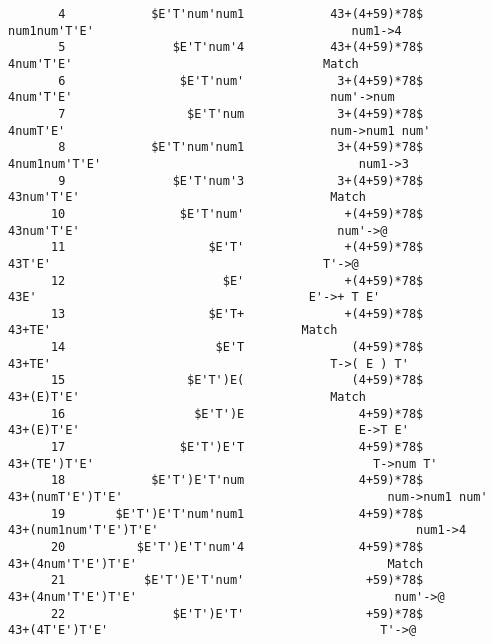 \documentclass[UTF8]{ctexart}
\begin{document}
\begin{lstlisting}
       4            $E'T'num'num1            43+(4+59)*78$                              num1num'T'E'                                    num1->4
       5               $E'T'num'4            43+(4+59)*78$                              4num'T'E'                                   Match
       6                $E'T'num'             3+(4+59)*78$                             4num'T'E'                                    num'->num
       7                 $E'T'num             3+(4+59)*78$                             4numT'E'                                     num->num1 num'
       8            $E'T'num'num1             3+(4+59)*78$                             4num1num'T'E'                                    num1->3
       9               $E'T'num'3             3+(4+59)*78$                             43num'T'E'                                   Match
      10                $E'T'num'              +(4+59)*78$                            43num'T'E'                                    num'->@
      11                    $E'T'              +(4+59)*78$                            43T'E'                                      T'->@
      12                      $E'              +(4+59)*78$                            43E'                                      E'->+ T E'
      13                    $E'T+              +(4+59)*78$                            43+TE'                                   Match
      14                     $E'T               (4+59)*78$                           43+TE'                                       T->( E ) T'
      15                 $E'T')E(               (4+59)*78$                           43+(E)T'E'                                   Match
      16                  $E'T')E                4+59)*78$                          43+(E)T'E'                                       E->T E'
      17                $E'T')E'T                4+59)*78$                          43+(TE')T'E'                                       T->num T'
      18            $E'T')E'T'num                4+59)*78$                          43+(numT'E')T'E'                                     num->num1 num'
      19       $E'T')E'T'num'num1                4+59)*78$                          43+(num1num'T'E')T'E'                                    num1->4
      20          $E'T')E'T'num'4                4+59)*78$                          43+(4num'T'E')T'E'                                   Match
      21           $E'T')E'T'num'                 +59)*78$                         43+(4num'T'E')T'E'                                    num'->@
      22               $E'T')E'T'                 +59)*78$                         43+(4T'E')T'E'                                      T'->@

\end{lstlisting}
\end{document}
